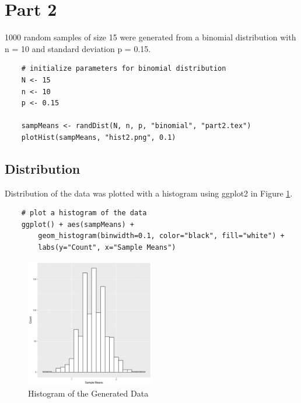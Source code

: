 \documentclass[paper=letter, fontsize=11pt]{article}
\begin{document}
    \section{Part 2}
        1000 random samples of size 15 were generated from a binomial distribution with n = 10 and standard deviation p = 0.15.

\begin{lstlisting}
    # initialize parameters for binomial distribution
    N <- 15
    n <- 10
    p <- 0.15

    sampMeans <- randDist(N, n, p, "binomial", "part2.tex")
    plotHist(sampMeans, "hist2.png", 0.1)
\end{lstlisting}

        

        \subsection{Distribution}
            Distribution of the data was plotted with a histogram using ggplot2 in Figure \ref{fig:hist2}.
\begin{lstlisting}
    # plot a histogram of the data
    ggplot() + aes(sampMeans) + 
        geom_histogram(binwidth=0.1, color="black", fill="white") +
        labs(y="Count", x="Sample Means")
\end{lstlisting}

            \begin{figure}[h!]
                \begin{center}
                    \includegraphics[width=0.5\textwidth]{figures/hist2.png}
                    \caption{Histogram of the Generated Data} \label{fig:hist2}
                \end{center}
            \end{figure}
\end{document}
